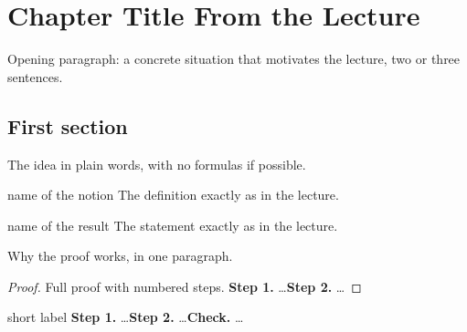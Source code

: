 \renewcommand{\tabname}{I}
\chapter{Chapter Title From the Lecture}\label{ch:one}

Opening paragraph: a concrete situation that motivates the lecture, two or three sentences.

\section{First section}

\begin{intuition}
The idea in plain words, with no formulas if possible.
\end{intuition}

\begin{definition}{name of the notion}
The definition exactly as in the lecture.
\end{definition}

\begin{theorem}[label=thm:sample]{name of the result}
The statement exactly as in the lecture.
\end{theorem}

\begin{intuition}
Why the proof works, in one paragraph.
\end{intuition}

\begin{proof}
Full proof with numbered steps. \textbf{Step 1.} \dots \textbf{Step 2.} \dots
\end{proof}

\begin{example}{short label}
\textbf{Step 1.} \dots\quad \textbf{Step 2.} \dots\quad \textbf{Check.} \dots
\end{example}


